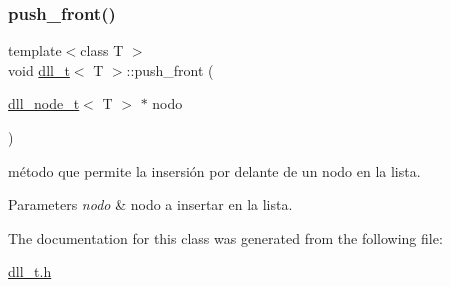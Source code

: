 \subsubsection{\texorpdfstring{push\+\_\+front()}{push\_front()}}
{\footnotesize\ttfamily template$<$class T $>$ \\
void \hyperlink{classdll__t}{dll\+\_\+t}$<$ T $>$\+::push\+\_\+front (\begin{DoxyParamCaption}\item[{\hyperlink{classdll__node__t}{dll\+\_\+node\+\_\+t}$<$ T $>$ $\ast$}]{nodo }\end{DoxyParamCaption})}



método que permite la insersión por delante de un nodo en la lista. 


\begin{DoxyParams}{Parameters}
{\em nodo} & nodo a insertar en la lista. \\
\hline
\end{DoxyParams}


The documentation for this class was generated from the following file\+:\begin{DoxyCompactItemize}
\item 
\hyperlink{dll__t_8h}{dll\+\_\+t.\+h}\end{DoxyCompactItemize}
